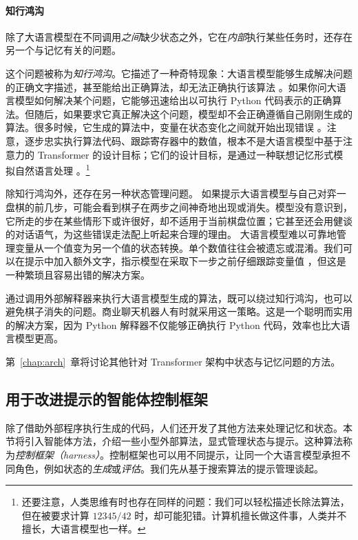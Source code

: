 \paragraph{知行鸿沟}\label{sec:knowing}
除了大语言模型在不同调用{\em 之间}缺少状态之外，它在{\em 内部}执行某些任务时，还存在另一个与记忆有关的问题。

这个问题被称为{\em 知行鸿沟}。它描述了一种奇特现象：大语言模型能够生成解决问题的正确文字描述，甚至能给出正确算法，却无法正确执行该算法 \citep{paglieri2024balrog}。如果你问大语言模型如何解决某个问题，它能够迅速给出以可执行 Python 代码表示的正确算法。但随后，如果要求它真正解决这个问题，模型却不会正确遵循自己刚刚生成的算法。很多时候，它生成的算法中，变量在状态变化之间就开始出现错误 \citep{paglieri2024balrog,ruoss2024lmact}。注意，逐步忠实执行算法代码、跟踪寄存器中的数值，根本不是大语言模型中基于注意力的 Transformer 的设计目标；它们的设计目标，是通过一种联想记忆形式模拟自然语言处理 \citep{la2024code}。\footnote{还要注意，人类思维有时也存在同样的问题：我们可以轻松描述长除法算法，但在被要求计算 $12345/42$ 时，却可能犯错。计算机擅长做这件事，人类并不擅长，大语言模型也一样。}

除知行鸿沟外，还存在另一种状态管理问题。
如果提示大语言模型与自己对弈一盘棋的前几步，可能会看到棋子在两步之间神奇地出现或消失。模型没有意识到，它所走的步在某些情形下或许很好，却不适用于当前棋盘位置；它甚至还会用健谈的对话语气，为这些错误走法配上听起来合理的理由。
大语言模型难以可靠地管理变量从一个值变为另一个值的状态转换。单个数值往往会被遗忘或混淆。我们可以在提示中加入额外文字，指示模型在采取下一步之前仔细跟踪变量值 \citep{la2024code}，但这是一种繁琐且容易出错的解决方案。

通过调用外部解释器来执行大语言模型生成的算法，既可以绕过知行鸿沟，也可以避免棋子消失的问题。商业聊天机器人有时就采用这一策略。这是一个聪明而实用的解决方案，因为 Python 解释器不仅能够正确执行 Python 代码，效率也比大语言模型更高。

第~\ref{chap:arch}~章将讨论其他针对 Transformer 架构中状态与记忆问题的方法。

\subsection{用于改进提示的智能体控制框架}\label{sec:self-reflection}\label{sec:inferencetime}

除了借助外部程序执行生成的代码，人们还开发了其他方法来处理记忆和状态。本节将引入智能体方法，介绍一些小型外部算法，显式管理状态与提示。这种算法称为{\em 控制框架（harness）}。控制框架也可以用不同提示，让同一个大语言模型承担不同角色，例如状态的{\em 生成}或{\em 评估}。我们先从基于搜索算法的提示管理谈起。


